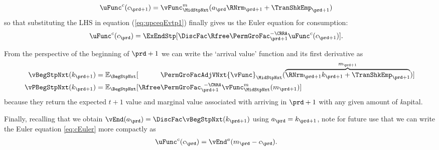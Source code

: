 \begin{equation}\begin{gathered}\begin{aligned}
      \uFunc^{{c}}({c}_{\prd+1})  & = {\vFunc}^{{m}}_{\MidStpNxt}({a}_{\prd}\RNrm_{\prd+1}+\TranShkEmp_{\prd+1}) \label{eq:upctp1EqVpxtp1}
    \end{aligned}\end{gathered}\end{equation}
so that substituting the LHS in equation (\ref{eq:upceqEvtp1}) finally gives us the Euler equation for consumption:
  \begin{equation}\begin{gathered}\begin{aligned}
        \uFunc^{{c}}({c}_{\prd})  & = \ExEndStp[\DiscFac\Rfree \PermGroFac_{\prd+1}^{-\CRRA}\uFunc^{{c}}({c}_{\prd+1})] \label{eq:cEuler}.
      \end{aligned}\end{gathered}\end{equation}

From the perspective of the beginning of {\interval} $\prd+1$ we can write the `arrival value' function and its first derivative as
  \begin{equation}\begin{gathered}\begin{aligned}
        \vBegStpNxt({k}_{\prd+1})    & = \Ex_{\BegStpNxt}[\phantom{\Rfree}\PermGroFacAdjVNxt{\vFunc}_{\MidStpNxt}(\overbrace{\RNrm_{\prd+1}{k}_{\prd+1}+{\TranShkEmp}_{\prd+1}}^{{m}_{\prd+1}})] \label{eq:vFuncBegtpdefn} \\
        {\vPBegStpNxt}({k}_{\prd+1}) & = \Ex_{\BegStpNxt}[\Rfree \PermGroFac_{\prd+1}^{\phantom{1}-\CRRA} {\vFunc}_{\MidStpNxt}^{{m}}({m}_{\prd+1})]
      \end{aligned}\end{gathered}\end{equation}
because they return the expected $t+1$ value and marginal value associated with arriving in {\interval} $\prd+1$ with any given amount of \textit{k}apital.

Finally, recalling that we obtain $\vEnd({a}_{\prd}) = \DiscFac \vBegStpNxt({k}_{\prd+1})$ using ${a}_{\prd} = {k}_{\prd+1}$, note for future use that we can write the Euler equation \eqref{eq:cEuler} more compactly as
  \begin{equation}\begin{gathered}\begin{aligned}
        \uFunc^{{c}}({c}_{\prd})   & = \vEnd^{{a}}({m}_{\prd}-{c}_{\prd}).
        \label{eq:upEqbetaOp}
      \end{aligned}\end{gathered}\end{equation}

